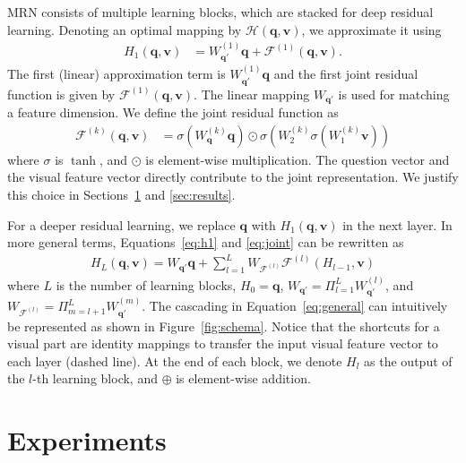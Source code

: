 \documentclass{article}
\newcommand{\vv}[0]{\mathbf{v}}
\newcommand{\vq}[0]{\mathbf{q}}
\begin{document}
MRN consists of multiple learning blocks, which are stacked for deep residual learning. Denoting an optimal mapping by $\mathcal{H}(\vq,\vv)$, we approximate it using \begin{align}
   \label{eq:h1}
   H_{1}(\vq,\vv) &= W_{\vq'}^{(1)} \vq + \mathcal{F}^{(1)}(\vq,\vv). 
\end{align}
The first (linear) approximation term is $W^{(1)}_{\vq'} \vq$ and the first joint residual function is given by $\mathcal{F}^{(1)}(\vq,\vv)$. The linear mapping $W_{\vq'}$ is used for matching a feature dimension. We define the joint residual function as \begin{align}
   \label{eq:joint}
\mathcal{F}^{(k)}(\vq,\vv) &= \sigma(W_{\vq}^{(k)} \vq) \odot \sigma(W_{2}^{(k)} \sigma(W_{1}^{(k)} \vv))
\end{align}
where $\sigma$ is $\tanh$, and $\odot$ is element-wise multiplication. The question vector and the visual feature vector directly contribute to the joint representation. We justify this choice in Sections~\ref{sec:experiments} and \ref{sec:results}.

For a deeper residual learning, we replace $\vq$ with $H_{1}(\vq,\vv)$ in the next layer. In more general terms, Equations~\ref{eq:h1} and \ref{eq:joint} can be rewritten as \begin{align}
   \label{eq:general}
   H_{L}(\vq,\vv) = W_{\vq'} \vq + \sum_{l=1}^{L} W_{\mathcal{F}^{(l)}} \mathcal{F}^{(l)}(H_{l-1},\vv)
\end{align}
where $L$ is the number of learning blocks, $H_{0} = \vq$, $W_{\vq'} = \Pi_{l=1}^{L}W_{\vq'}^{(l)}$, and $W_{\mathcal{F}^{(l)}} = \Pi_{m=l+1}^{L}W_{\vq'}^{(m)}$. The cascading in Equation~\ref{eq:general} can intuitively be represented as shown in Figure~\ref{fig:schema}. Notice that the shortcuts for a visual part are identity mappings to transfer the input visual feature vector to each layer (dashed line). At the end of each block, we denote $H_{l}$ as the output of the $l$-th learning block, and $\oplus$ is element-wise addition.

\section{Experiments}
\label{sec:experiments}
\end{document}
